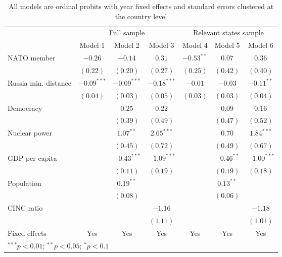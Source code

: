 
\begin{table}[h]
\begin{center}
\begin{tabular}{l c c c c c c}
\hline
 & \multicolumn{3}{c}{Full sample} & \multicolumn{3}{c}{Relevant states sample} \\
\cline{2-4} \cline{5-7}
 & Model 1 & Model 2 & Model 3 & Model 4 & Model 5 & Model 6 \\
\hline
NATO member          & $-0.26$       & $-0.14$       & $0.31$        & $-0.53^{**}$ & $0.07$       & $0.36$        \\
                     & $(0.22)$      & $(0.20)$      & $(0.27)$      & $(0.25)$     & $(0.42)$     & $(0.40)$      \\
Russia min. distance & $-0.09^{***}$ & $-0.09^{***}$ & $-0.18^{***}$ & $-0.01$      & $-0.03$      & $-0.11^{**}$  \\
                     & $(0.04)$      & $(0.03)$      & $(0.05)$      & $(0.03)$     & $(0.03)$     & $(0.04)$      \\
Democracy            &               & $0.25$        & $0.22$        &              & $0.09$       & $0.16$        \\
                     &               & $(0.39)$      & $(0.49)$      &              & $(0.47)$     & $(0.52)$      \\
Nuclear power        &               & $1.07^{**}$   & $2.65^{***}$  &              & $0.70$       & $1.84^{***}$  \\
                     &               & $(0.45)$      & $(0.72)$      &              & $(0.49)$     & $(0.67)$      \\
GDP per capita       &               & $-0.43^{***}$ & $-1.09^{***}$ &              & $-0.46^{**}$ & $-1.00^{***}$ \\
                     &               & $(0.11)$      & $(0.19)$      &              & $(0.19)$     & $(0.18)$      \\
Population           &               & $0.19^{**}$   &               &              & $0.13^{**}$  &               \\
                     &               & $(0.08)$      &               &              & $(0.06)$     &               \\
CINC ratio           &               &               & $-1.16$       &              &              & $-1.18$       \\
                     &               &               & $(1.11)$      &              &              & $(1.01)$      \\
\hline
Fixed effects        & Yes           & Yes           & Yes           & Yes          & Yes          & Yes           \\
\hline
\multicolumn{7}{l}{\scriptsize{$^{***}p<0.01$; $^{**}p<0.05$; $^{*}p<0.1$}}
\end{tabular}
\caption{All models are ordinal probits with year fixed effects and standard errors clustered at the country level}
\label{table:model}
\end{center}
\end{table}

